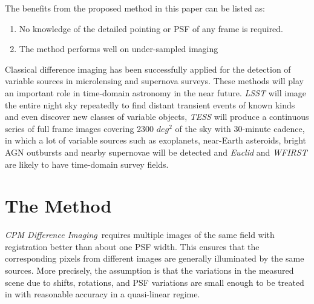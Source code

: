 \documentclass[12pt, preprint]{aastex}
\newcommand{\project}[1]{\textsl{#1}}
\newcommand{\cpmdiff}{\project{CPM Difference Imaging}}
\begin{document}
The benefits from the proposed method in this paper can be listed as: 
\begin{enumerate}
\item No knowledge of the detailed pointing or PSF of any frame is required. 
\item The method performs well on under-sampled imaging
\end{enumerate}

Classical difference imaging has been successfully applied for the detection of variable sources in microlensing \citep{macho, ogle} and supernova \citep{sdss} surveys.
These methods will play an important role in time-domain astronomy in the near future. 
\project{LSST} \citep{lsst} will image the entire night sky repeatedly to find distant transient events of known kinds and even discover new classes of variable objects, \project{TESS} \citep{tess} will produce a continuous series of full frame images covering 2300 $deg^2$ of the sky with 30-minute cadence, in which a lot of variable sources such as exoplanets, near-Earth asteroids, bright AGN outbursts and nearby supernovae will be detected and \project{Euclid} \citep{Euclid} and \project{WFIRST} \citep{wfirst} are likely to have time-domain survey fields.


\section{The Method} \label{method}
\cpmdiff\ requires multiple images of the same field with registration better than about one PSF width.
This ensures that the corresponding pixels from different images are generally illuminated by the same sources. 
More precisely, the assumption is that the variations in the measured scene due to shifts, rotations, and PSF variations are small enough to be treated in with reasonable accuracy in a quasi-linear regime.
\end{document}
